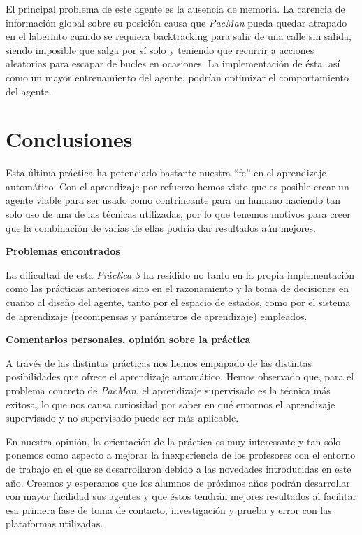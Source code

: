 \documentclass[12pt]{article}
\begin{document}

El principal problema de este agente es la ausencia de memoria. La carencia de información global sobre su posición causa que \textit{PacMan} pueda quedar atrapado en el laberinto cuando se requiera backtracking para salir de una calle sin salida, siendo imposible que salga por sí solo y teniendo que recurrir a acciones aleatorias para escapar de bucles en ocasiones. La implementación de ésta, así como un mayor entrenamiento del agente, podrían optimizar el comportamiento del agente.

\newpage
\section{Conclusiones}


Esta última práctica ha potenciado bastante nuestra ``fe'' en el aprendizaje automático. Con el aprendizaje por refuerzo hemos visto que es posible crear un agente viable para ser usado como contrincante para un humano haciendo tan solo uso de una de las técnicas utilizadas, por lo que tenemos motivos para creer que la combinación de varias de ellas podría dar resultados aún mejores.

\vspace{0.5cm}
\centerline{\textbf{Problemas encontrados}}
\vspace{0.5cm}

La dificultad de esta \textit{Práctica 3} ha residido no tanto en la propia implementación como las prácticas anteriores sino en el razonamiento y la toma de decisiones en cuanto al diseño del agente, tanto por el espacio de estados, como por el sistema de aprendizaje (recompensas y parámetros de aprendizaje) empleados.

\vspace{0.5cm}
\centerline{\textbf{Comentarios personales, opinión sobre la práctica}}
\vspace{0.5cm}

A través de las distintas prácticas nos hemos empapado de las distintas posibilidades que ofrece el aprendizaje automático. Hemos observado que, para el problema concreto de \textit{PacMan}, el aprendizaje supervisado es la técnica más exitosa, lo que nos causa curiosidad por saber en qué entornos el aprendizaje supervisado y no supervisado puede ser más aplicable.

En nuestra opinión, la orientación de la práctica es muy interesante y tan sólo ponemos como aspecto a mejorar la inexperiencia de los profesores con el entorno de trabajo en el que se desarrollaron debido a las novedades introducidas en este año. Creemos y esperamos que los alumnos de próximos años podrán desarrollar con mayor facilidad sus agentes y que éstos tendrán mejores resultados al facilitar esa primera fase de toma de contacto, investigación y prueba y error con las plataformas utilizadas.
\end{document}
